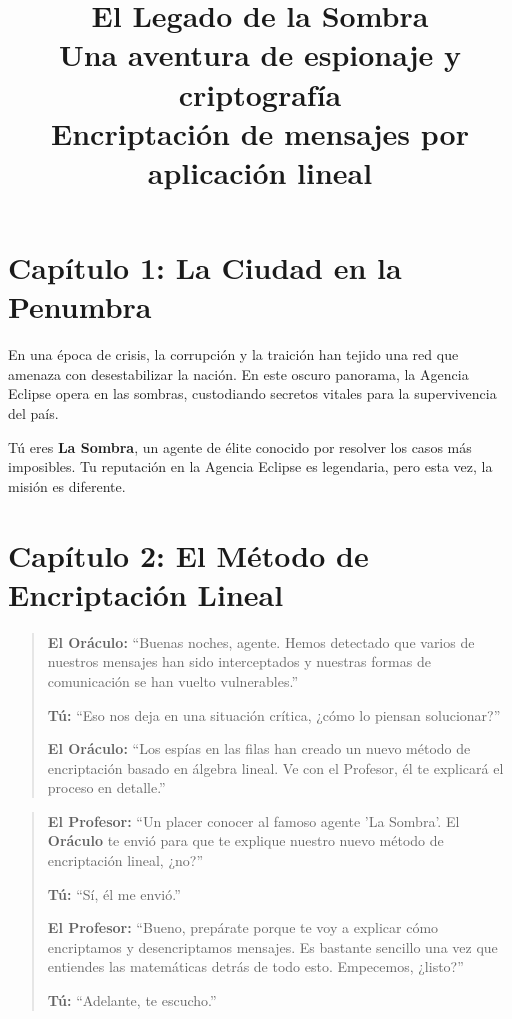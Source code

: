\documentclass[10pt,a4paper]{article}
\title{\textbf{El Legado de la Sombra} \\ \large Una aventura de espionaje y criptografía \\ \normalsize Encriptación de mensajes por aplicación lineal}
\date{}
\begin{document}
\maketitle

\section*{Capítulo 1: La Ciudad en la Penumbra}
En una época de crisis, la corrupción y la traición han tejido una red que amenaza con desestabilizar la nación. En este oscuro panorama, la Agencia Eclipse opera en las sombras, custodiando secretos vitales para la supervivencia del país.

Tú eres \textbf{La Sombra}, un agente de élite conocido por resolver los casos más imposibles. Tu reputación en la Agencia Eclipse es legendaria, pero esta vez, la misión es diferente.

\section*{Capítulo 2: El Método de Encriptación Lineal}

\begin{quote}
\textbf{El Oráculo:} ``Buenas noches, agente. Hemos detectado que varios de nuestros mensajes han sido interceptados y nuestras formas de comunicación se han vuelto vulnerables.''

\textbf{Tú:} ``Eso nos deja en una situación crítica, ¿cómo lo piensan solucionar?''

\textbf{El Oráculo:} ``Los espías en las filas han creado un nuevo método de encriptación basado en álgebra lineal. Ve con el Profesor, él te explicará el proceso en detalle.''
\end{quote}


\begin{quote}
\textbf{El Profesor:} ``Un placer conocer al famoso agente 'La Sombra'. El \textbf{Oráculo} te envió para que te explique nuestro nuevo método de encriptación lineal, ¿no?''

\textbf{Tú:} ``Sí, él me envió.''

\textbf{El Profesor:} ``Bueno, prepárate porque te voy a explicar cómo encriptamos y desencriptamos mensajes. Es bastante sencillo una vez que entiendes las matemáticas detrás de todo esto. Empecemos, ¿listo?''

\textbf{Tú:} ``Adelante, te escucho.''
\end{quote}
\end{document}
